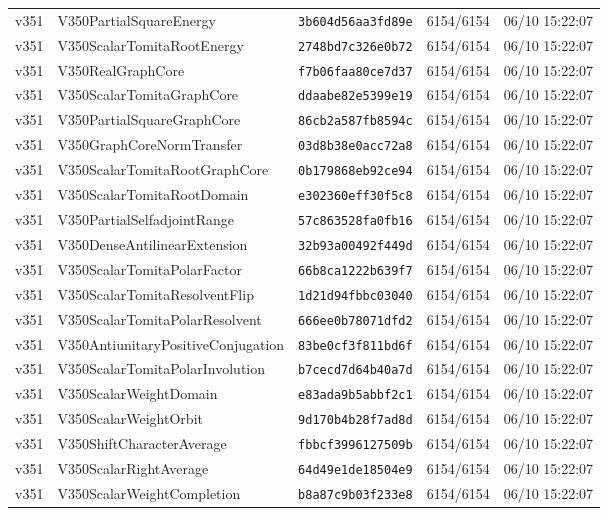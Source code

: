\documentclass[11pt]{article}
\theoremstyle{definition}\newtheorem{deriv}{Derivation}
\begin{document}
{\begin{longtable}{@{}lllll@{}}
v351 & V350PartialSquareEnergy & \texttt{3b604d56aa3fd89e} & 6154/6154 & 06/10 15:22:07 \\
v351 & V350ScalarTomitaRootEnergy & \texttt{2748bd7c326e0b72} & 6154/6154 & 06/10 15:22:07 \\
v351 & V350RealGraphCore & \texttt{f7b06faa80ce7d37} & 6154/6154 & 06/10 15:22:07 \\
v351 & V350ScalarTomitaGraphCore & \texttt{ddaabe82e5399e19} & 6154/6154 & 06/10 15:22:07 \\
v351 & V350PartialSquareGraphCore & \texttt{86cb2a587fb8594c} & 6154/6154 & 06/10 15:22:07 \\
v351 & V350GraphCoreNormTransfer & \texttt{03d8b38e0acc72a8} & 6154/6154 & 06/10 15:22:07 \\
v351 & V350ScalarTomitaRootGraphCore & \texttt{0b179868eb92ce94} & 6154/6154 & 06/10 15:22:07 \\
v351 & V350ScalarTomitaRootDomain & \texttt{e302360eff30f5c8} & 6154/6154 & 06/10 15:22:07 \\
v351 & V350PartialSelfadjointRange & \texttt{57c863528fa0fb16} & 6154/6154 & 06/10 15:22:07 \\
v351 & V350DenseAntilinearExtension & \texttt{32b93a00492f449d} & 6154/6154 & 06/10 15:22:07 \\
v351 & V350ScalarTomitaPolarFactor & \texttt{66b8ca1222b639f7} & 6154/6154 & 06/10 15:22:07 \\
v351 & V350ScalarTomitaResolventFlip & \texttt{1d21d94fbbc03040} & 6154/6154 & 06/10 15:22:07 \\
v351 & V350ScalarTomitaPolarResolvent & \texttt{666ee0b78071dfd2} & 6154/6154 & 06/10 15:22:07 \\
v351 & V350AntiunitaryPositiveConjugation & \texttt{83be0cf3f811bd6f} & 6154/6154 & 06/10 15:22:07 \\
v351 & V350ScalarTomitaPolarInvolution & \texttt{b7cecd7d64b40a7d} & 6154/6154 & 06/10 15:22:07 \\
v351 & V350ScalarWeightDomain & \texttt{e83ada9b5abbf2c1} & 6154/6154 & 06/10 15:22:07 \\
v351 & V350ScalarWeightOrbit & \texttt{9d170b4b28f7ad8d} & 6154/6154 & 06/10 15:22:07 \\
v351 & V350ShiftCharacterAverage & \texttt{fbbcf3996127509b} & 6154/6154 & 06/10 15:22:07 \\
v351 & V350ScalarRightAverage & \texttt{64d49e1de18504e9} & 6154/6154 & 06/10 15:22:07 \\
v351 & V350ScalarWeightCompletion & \texttt{b8a87c9b03f233e8} & 6154/6154 & 06/10 15:22:07 \\

\end{longtable}}
\end{document}
